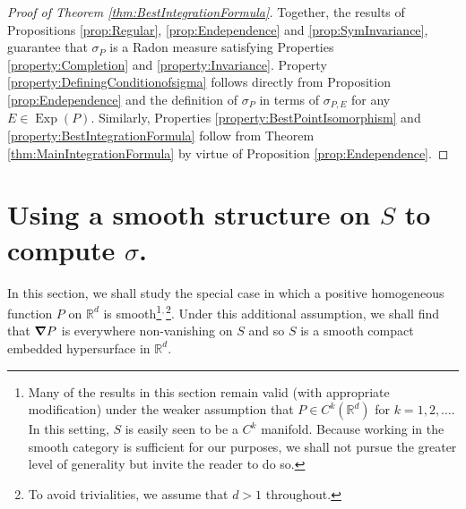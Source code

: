 \documentclass[11pt]{article}
\theoremstyle{remark}
\newcommand\Exp{\operatorname{Exp}}
\begin{document}
\begin{proof}[Proof of Theorem \ref{thm:BestIntegrationFormula}]
Together, the results of Propositions \ref{prop:Regular}, \ref{prop:Endependence} and \ref{prop:SymInvariance}, guarantee that $\sigma_P$ is a Radon measure satisfying Properties \ref{property:Completion} and \ref{property:Invariance}. Property \ref{property:DefiningConditionofsigma} follows directly from Proposition \ref{prop:Endependence} and the definition of $\sigma_P$ in terms of $\sigma_{P,E}$ for any $E\in\Exp(P)$. Similarly, Properties \ref{property:BestPointIsomorphism} and \ref{property:BestIntegrationFormula} follow from Theorem \ref{thm:MainIntegrationFormula} by virtue of Proposition \ref{prop:Endependence}. 
\end{proof}


\section{Using a smooth structure on $S$ to compute $\sigma$.}\label{sec:SigmaForSmoothP}

\noindent In this section, we shall study the special case in which a positive homogeneous function $P$ on $\mathbb{R}^d$ is smooth\footnote{Many of the results in this section remain valid (with appropriate modification) under the weaker assumption that $P\in C^k(\mathbb{R}^d)$ for $k=1,2,\dots$. In this setting, $S$ is easily seen to be a $C^k$ manifold. Because working in the smooth category is sufficient for our purposes, we shall not pursue the greater level of generality but invite the reader to do so.}$^{\mbox{\tiny{,}}}$\footnote{To avoid trivialities, we assume that $d>1$ throughout.}.
Under this additional assumption, we shall find that $\grad P$ is everywhere non-vanishing on $S$ and so $S$ is a smooth compact embedded hypersurface in $\mathbb{R}^d$.\\
\end{document}
